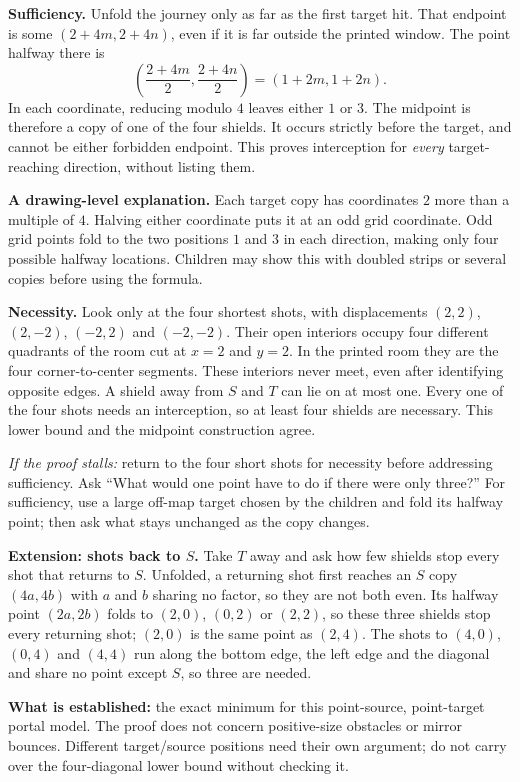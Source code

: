 \documentclass[11pt,letterpaper]{article}
\newcommand{\sectiontitle}[1]{\par\vspace{4pt}{\large\bfseries #1}\par}
\begin{document}
\textbf{Sufficiency.} Unfold the journey only as far as the first target hit. That endpoint is some $(2+4m,2+4n)$, even if it is far outside the printed window. The point halfway there is
\[
\left(\frac{2+4m}{2},\frac{2+4n}{2}\right)=(1+2m,1+2n).
\]
In each coordinate, reducing modulo $4$ leaves either $1$ or $3$. The midpoint is therefore a copy of one of the four shields. It occurs strictly before the target, and cannot be either forbidden endpoint. This proves interception for \emph{every} target-reaching direction, without listing them.

\textbf{A drawing-level explanation.} Each target copy has coordinates $2$ more than a multiple of $4$. Halving either coordinate puts it at an odd grid coordinate. Odd grid points fold to the two positions $1$ and $3$ in each direction, making only four possible halfway locations. Children may show this with doubled strips or several copies before using the formula.

\textbf{Necessity.} Look only at the four shortest shots, with displacements $(2,2)$, $(2,-2)$, $(-2,2)$ and $(-2,-2)$. Their open interiors occupy four different quadrants of the room cut at $x=2$ and $y=2$. In the printed room they are the four corner-to-center segments. These interiors never meet, even after identifying opposite edges. A shield away from $S$ and $T$ can lie on at most one. Every one of the four shots needs an interception, so at least four shields are necessary. This lower bound and the midpoint construction agree.

\textit{If the proof stalls:} return to the four short shots for necessity before addressing sufficiency. Ask ``What would one point have to do if there were only three?'' For sufficiency, use a large off-map target chosen by the children and fold its halfway point; then ask what stays unchanged as the copy changes.

\textbf{Extension: shots back to $S$.} Take $T$ away and ask how few shields stop every shot that returns to $S$. Unfolded, a returning shot first reaches an $S$ copy $(4a,4b)$ with $a$ and $b$ sharing no factor, so they are not both even. Its halfway point $(2a,2b)$ folds to $(2,0)$, $(0,2)$ or $(2,2)$, so these three shields stop every returning shot; $(2,0)$ is the same point as $(2,4)$. The shots to $(4,0)$, $(0,4)$ and $(4,4)$ run along the bottom edge, the left edge and the diagonal and share no point except $S$, so three are needed.

\sectiontitle{Use the conclusion carefully}
\textbf{What is established:} the exact minimum for this point-source, point-target portal model. The proof does not concern positive-size obstacles or mirror bounces. Different target/source positions need their own argument; do not carry over the four-diagonal lower bound without checking it.
\end{document}

